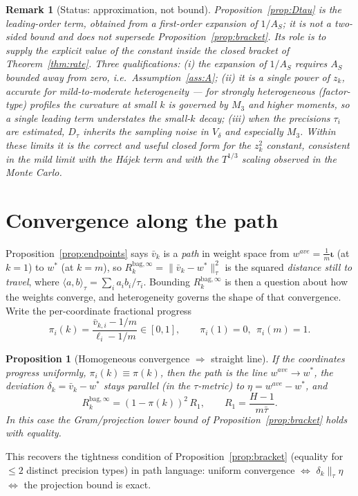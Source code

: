 \documentclass[11pt]{article}
\newcommand{\Rk}{R_k^{\mathrm{bag},\infty}}
\newcommand{\iotab}{\bm{\iota}}
\newtheorem{proposition}{Proposition}
\newtheorem{remark}{Remark}
\begin{document}
\begin{remark}[Status: approximation, not bound]\label{rem:status}
Proposition~\ref{prop:Dtau} is the \emph{leading-order} term, obtained from a first-order
expansion of $1/A_S$; it is not a two-sided bound and does not supersede
Proposition~\ref{prop:bracket}. Its role is to supply the explicit value of the constant
inside the closed bracket of Theorem~\ref{thm:rate}. Three qualifications:
(i) the expansion of $1/A_S$ requires $A_S$ bounded away from zero, i.e.\
Assumption~\ref{ass:A}; (ii) it is a single power of $z_k$, accurate for mild-to-moderate
heterogeneity --- for strongly heterogeneous (factor-type) profiles the curvature at
small $k$ is governed by $M_3$ and higher moments, so a single leading term understates
the small-$k$ decay; (iii) when the precisions $\tau_i$ are estimated, $D_\tau$ inherits
the sampling noise in $V_\delta$ and especially $M_3$. Within these limits it is the
correct and useful closed form for the $z_k^2$ constant, consistent in the mild limit
with the H\'ajek term and with the $T^{1/3}$ scaling observed in the Monte Carlo.
\end{remark}

\section{Convergence along the path}\label{sec:path}
Proposition~\ref{prop:endpoints} says $\bar v_k$ is a \emph{path} in weight space from
$w^{ave}=\frac1m\iotab$ (at $k=1$) to $w^\ast$ (at $k=m$), so
$\Rk=\|\bar v_k-w^\ast\|_\tau^2$ is the squared \emph{distance still to travel}, where
$\langle a,b\rangle_\tau=\sum_i a_ib_i/\tau_i$. Bounding $\Rk$ is then a question about how
the weights converge, and heterogeneity governs the shape of that convergence. Write the
per-coordinate fractional progress
\[
  \pi_i(k)=\frac{\bar v_{k,i}-1/m}{\ell_i-1/m}\in[0,1],\qquad \pi_i(1)=0,\ \ \pi_i(m)=1 .
\]

\begin{proposition}[Homogeneous convergence $\Rightarrow$ straight line]\label{prop:homog}
If the coordinates progress uniformly, $\pi_i(k)\equiv\pi(k)$, then the path is the line
$w^{ave}\!\to\! w^\ast$, the deviation $\delta_k=\bar v_k-w^\ast$ stays parallel (in the
$\tau$-metric) to $\eta=w^{ave}-w^\ast$, and
\[
  \Rk=(1-\pi(k))^2\,R_1,\qquad R_1=\frac{H-1}{m\bar\tau}.
\]
In this case the Gram/projection lower bound of Proposition~\ref{prop:bracket} holds with
\emph{equality}.
\end{proposition}
\noindent This recovers the tightness condition of Proposition~\ref{prop:bracket}
(equality for $\le2$ distinct precision types) in path language: uniform convergence
$\Leftrightarrow$ $\delta_k\parallel_\tau\eta$ $\Leftrightarrow$ the projection bound is exact.
\end{document}
